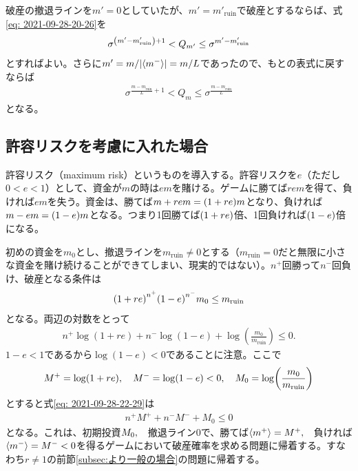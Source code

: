 \documentclass[twoside,openright,a4paper,papersize,uplatex,dvipdfmx]{jsarticle}
\newcommand{\rrr}{r} %
\begin{document}
  破産の撤退ラインを$m' = 0$としていたが、$m' = m'_{\mathrm{ruin}}$で破産とするならば、式\eqref{eq: 2021-09-28-20-26}を
  \begin{align*}
    \sigma^{ \qty(m' - m'_{\mathrm{ruin}}) + 1} < Q_{m'} \le  \sigma^{m' - m'_{\mathrm{ruin}} }
  \end{align*}
  とすればよい。さらに$m' = m / \abs{\expval{m^{-}}} = m / L$であったので、もとの表式に戻すならば
  \begin{align*}
    \sigma^{
      \frac{
        m - m_{ \mathrm{ruin} }
      }{
        L
      } + 1
    } < Q_{m} \le \sigma^{
      \frac{
        m - m_{\mathrm{ruin}}
      }{
        L
      }
    }
  \end{align*}
  となる。

  \subsection{許容リスクを考慮に入れた場合} \label{subsec: 許容リスクを考慮に入れた場合}
  許容リスク（maximum risk）というものを導入する。許容リスクを$e$（ただし$0 < e < 1$）として、資金が$m$の時は$em$を賭ける。ゲームに勝てば$\rrr em$を得て、負ければ$em$を失う。資金は、勝てば$m + \rrr em = \qty(1 + \rrr e) m$となり、負ければ$m - em = \qty(1 - e) m$となる。つまり1回勝てば$\qty(1 + \rrr e)$倍、1回負ければ$\qty(1 - e)$倍になる。

  初めの資金を$m_{0}$とし、撤退ラインを$m_{\mathrm{ruin}} \neq 0$とする（$m_{\mathrm{ruin}} = 0$だと無限に小さな資金を賭け続けることができてしまい、現実的ではない）。$n^{+}$回勝って$n^{-}$回負け、破産となる条件は
  \begin{align*}
    \qty(1 + \rrr e)^{ n^{+} } \qty(1 - e)^{n^{-}}  m_{0} \le m_{\mathrm{ruin}}
  \end{align*}
  となる。両辺の対数をとって
  \begin{align} \label{eq: 2021-09-28-22-29}
    n^{+} \log( 1 + \rrr e ) + n^{-} \log(1 - e) + \log(\frac{m_{0}}{m_{\mathrm{ruin}}}) \le 0.
  \end{align}
  $1-e < 1$であるから$\log(1 - e) < 0$であることに注意。ここで
  \begin{align*}
    M^{+} = \log( 1 + \rrr e )  \qc
    M^{-} = \log(1 - e) < 0 \qc
    M_{0} = \log(
      \frac{
        m_{0}
      }{
        m_{\mathrm{ruin}}
      }
    )
  \end{align*}
  とすると式\eqref{eq: 2021-09-28-22-29}は
  \begin{align*}
    n^{+} M^{+} + n^{-} M^{-} + M_{0} \le 0
  \end{align*}
  となる。これは、初期投資$M_{0} \qc$撤退ライン$0$で、勝てば$\expval{ m^{+} } = M^{+} \qc$負ければ$\expval{ m^{-} } = M^{-} < 0 $を得るゲームにおいて破産確率を求める問題に帰着する。すなわち$\rrr \neq 1$の前節\ref{subsec:より一般の場合}の問題に帰着する。
\end{document}
